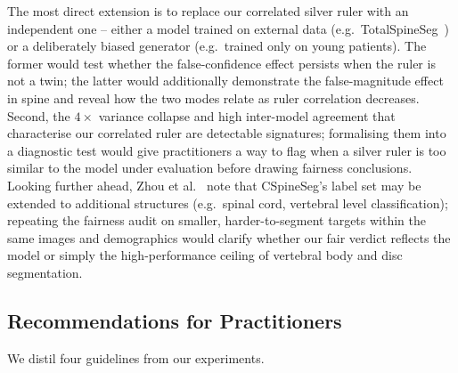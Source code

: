 The most direct extension is to replace our correlated silver ruler with an
independent one -- either a model trained on external data (e.g.\
TotalSpineSeg~\cite{deLeener2024totalspineseg}) or a deliberately biased
generator (e.g.\ trained only on young
patients). The former would test whether the false-confidence effect persists
when the ruler is not a twin; the latter would additionally demonstrate the
false-magnitude effect in spine and reveal how the two modes relate as ruler
correlation decreases. Second, the $4\times$ variance collapse and high
inter-model agreement that characterise our correlated ruler are detectable
signatures; formalising them into a diagnostic test would give practitioners a
way to flag when a silver ruler is too similar to the model under evaluation
before drawing fairness conclusions. Looking further ahead, Zhou et
al.~\cite{zhou2025cspineseg} note that CSpineSeg's label set may be extended to
additional structures (e.g.\ spinal cord, vertebral level classification);
repeating the fairness audit on smaller, harder-to-segment targets within the
same images and demographics would clarify whether our fair verdict reflects the
model or simply the high-performance ceiling of vertebral body and disc
segmentation.

\subsection{Recommendations for Practitioners}
\label{sec:recommendations}

We distil four guidelines from our experiments.

